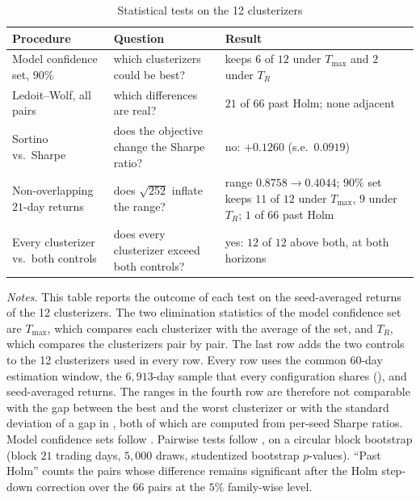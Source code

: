 \begin{table}[tb]
\centering
\caption{Statistical tests on the 12 clusterizers}
\label{tab:formal}
\begin{threeparttable}
\footnotesize
\setlength{\tabcolsep}{4pt}
\begin{tabular}{@{}p{3.1cm}p{3.4cm}p{5.3cm}@{}}
\toprule
Procedure & Question & Result \\
\midrule
Model confidence set, $90\%$ & which clusterizers could be best?
  & keeps $6$ of $12$ under $T_{\max}$ and $2$ under $T_R$ \\
Ledoit--Wolf, all pairs & which differences are real?
  & $21$ of $66$ past Holm; none adjacent \\
Sortino vs.\ Sharpe & does the objective change the Sharpe ratio? & no: $+0.1260$ (s.e.\ $0.0919$) \\
Non-overlapping $21$-day returns & does $\sqrt{252}$ inflate the range?
  & range $0.8758 \to 0.4044$; $90\%$ set keeps $11$ of $12$ under $T_{\max}$, $9$ under $T_R$; $1$ of $66$ past Holm \\
Every clusterizer vs.\ both controls & does every clusterizer exceed both controls?
  & yes: $12$ of $12$ above both, at both horizons \\
\bottomrule
\end{tabular}
\begin{tablenotes}[flushleft]\footnotesize
\item \emph{Notes.} This table reports the outcome of each test on the seed-averaged returns of the 12 clusterizers. The two elimination statistics of the model confidence set are $T_{\max}$, which compares each clusterizer with the average of the set, and $T_R$, which compares the clusterizers pair by pair. The last row adds the two controls to the 12 clusterizers used in every row. Every row uses the common 60-day estimation window, the $6{,}913$-day sample that every configuration shares (), and seed-averaged returns. The ranges in the fourth row are therefore not comparable with the gap between the best and the worst clusterizer or with the standard deviation of a gap in , both of which are computed from per-seed Sharpe ratios. Model confidence sets follow
\citet{hansen2011mcs}. Pairwise tests follow \citet{ledoit2008robust}, on a circular block bootstrap (block $21$ trading days, $5{,}000$ draws, studentized bootstrap $p$-values). ``Past Holm'' counts the pairs whose difference remains significant after the Holm step-down correction \citep{holm1979simple} over the $66$ pairs at the $5\%$ family-wise level.
\end{tablenotes}
\end{threeparttable}
\end{table}


